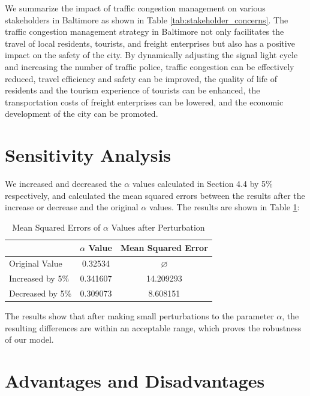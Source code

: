 \documentclass{mcmthesis}
\begin{document}
We summarize the impact of traffic congestion management on various stakeholders in Baltimore as shown in Table \ref{tab:stakeholder_concerns}. The traffic congestion management strategy in Baltimore not only facilitates the travel of local residents, tourists, and freight enterprises but also has a positive impact on the safety of the city. By dynamically adjusting the signal light cycle and increasing the number of traffic police, traffic congestion can be effectively reduced, travel efficiency and safety can be improved, the quality of life of residents and the tourism experience of tourists can be enhanced, the transportation costs of freight enterprises can be lowered, and the economic development of the city can be promoted.


\section{Sensitivity Analysis}

We increased and decreased the $\alpha$ values calculated in Section 4.4 by 5\% respectively, and calculated the mean squared errors between the results after the increase or decrease and the original $\alpha$ values. The results are shown in Table \ref{tab:alpha_mse}:

\begin{table}[H]
    \centering
    \caption{Mean Squared Errors of $\alpha$ Values after Perturbation}
    \label{tab:alpha_mse}
    \begin{tabular}{@{}lcc@{}}
        \toprule
        & \textbf{$\alpha$ Value} & \textbf{Mean Squared Error} \\
        \midrule
        Original Value & 0.32534 & \(\varnothing\) \\
        Increased by 5\% & 0.341607 & 14.209293 \\
        Decreased by 5\% & 0.309073 & 8.608151 \\
        \bottomrule
    \end{tabular}
\end{table}

The results show that after making small perturbations to the parameter $\alpha$, the resulting differences are within an acceptable range, which proves the robustness of our model.

\section{Advantages and Disadvantages}
\end{document}
